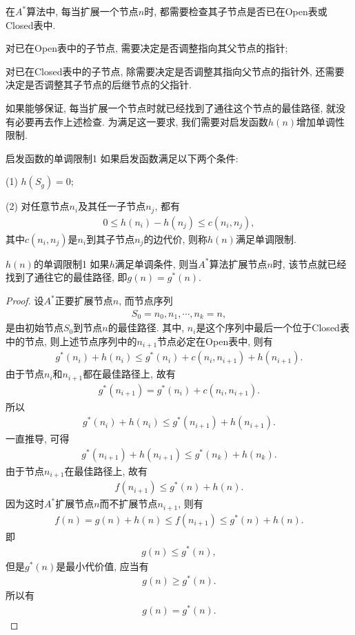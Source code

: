 在$A^*$算法中, 每当扩展一个节点$n$时, 都需要检查其子节点是否已在Open表或Closed表中.

 对已在Open表中的子节点, 需要决定是否调整指向其父节点的指针;

 对已在Closed表中的子节点, 除需要决定是否调整其指向父节点的指针外, 还需要决定是否调整其子节点的后继节点的父指针.

如果能够保证, 每当扩展一个节点时就已经找到了通往这个节点的最佳路径, 就没有必要再去作上述检查.
为满足这一要求, 我们需要对启发函数$h(n)$增加单调性限制.

\begin{mydef}{启发函数的单调限制}{1}
如果启发函数满足以下两个条件:

(1) $h(S_g)=0$;

(2) 对任意节点$n_i$及其任一子节点$n_j$, 都有
\begin{align}
    0\leq h(n_i)-h(n_j)\leq c(n_i, n_j),
\end{align}
其中$c(n_i, n_j)$是$n_i$到其子节点$n_j$的边代价, 则称$h(n)$满足单调限制.
\end{mydef}
\begin{mythm}{$h(n)$的单调限制}{1}
如果$h$满足单调条件, 则当$A^*$算法扩展节点$n$时, 该节点就已经找到了通往它的最佳路径, 即$g(n)=g^*(n)$.
\end{mythm}
\begin{proof}
设$A^*$正要扩展节点$n$, 而节点序列
\begin{align}
    S_0=n_0, n_1,\cdots,n_k=n,
\end{align}
是由初始节点$S_0$到节点$n$的最佳路径. 其中, $n_i$是这个序列中最后一个位于Closed表中的节点, 则上述节点序列中的$n_{i+1}$节点必定在Open表中, 则有
\begin{align}
     g^*(n_i)+h(n_i)\leq g^*(n_i) +c(n_i, n_{i+1}) +h(n_{i+1}).
\end{align}
由于节点$n_i$和$n_{i+1}$都在最佳路径上, 故有
\begin{align}
    g^*( n_{i+1} )=g^*(n_i )+c(n_i, n_{i+1}).
\end{align}
所以
\begin{align}
    g^*(n_i )+h(n_i )\leq g^*( n_{i+1}) +h(n_{i+1}).
\end{align}
一直推导, 可得
\begin{align}
    g^*( n_{i+1} )+h(n_{i+1})\leq g^*( n_k) +h(n_k).
\end{align}
由于节点$n_{i+1}$在最佳路径上, 故有
\begin{align}
  f( n_{i+1} )\leq g^*(n) +h(n).
\end{align}
因为这时$A^*$扩展节点$n$而不扩展节点$n_{i+1}$, 则有
\begin{align}
    f(n)=g(n)+h(n)\leq f( n_{i+1} )\leq g^*(n)+h(n).
\end{align}
即
\begin{align}
    g(n)\leq g^*(n),
\end{align}
但是$g^*(n)$是最小代价值, 应当有
\begin{align}
    g(n)\geq g^*(n).
\end{align}
所以有
\begin{align}
    g(n)=g^*(n).
\end{align}
\end{proof}
